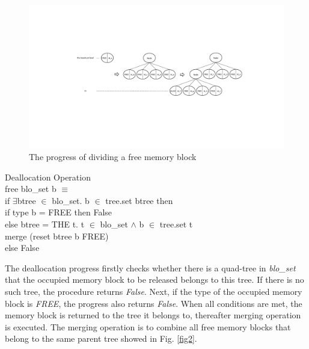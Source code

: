 \documentclass[runningheads]{llncs}
\begin{document}
\begin{figure}
\centering
\includegraphics[width=1\textwidth]{fig1.pdf}
\caption{The progress of dividing a free memory block}
\label{fig1}
\end{figure}

\begin{definition} {Deallocation Operation} \\
free blo\_set b $\equiv$ \\
\phantom{x} \hspace{10pt} if $\exists$btree $\in$ blo\_set. b $\in$ tree.set btree then \\
\phantom{x} \hspace{20pt} if type b = FREE then False \\
\phantom{x} \hspace{20pt} else btree = THE t. t $\in$ blo\_set $\wedge$ b $\in$ tree.set t \\
\phantom{x} \hspace{40pt} merge (reset btree b FREE) \\
\phantom{x} \hspace{10pt} else False
\end{definition}

The deallocation progress firstly checks whether there is a quad-tree in \textsl{blo\_set} that the occupied memory block to be released belongs to this tree. If there is no such tree, the procedure returns \textsl{False}. Next, if the type of the occupied memory block is \textsl{FREE}, the progress also returns \textsl{False}. When all conditions are met, the memory block is returned to the tree it belongs to, thereafter merging operation is executed. The merging operation is to combine all free memory blocks that belong to the same parent tree showed in Fig. \ref{fig2}.
\end{document}
